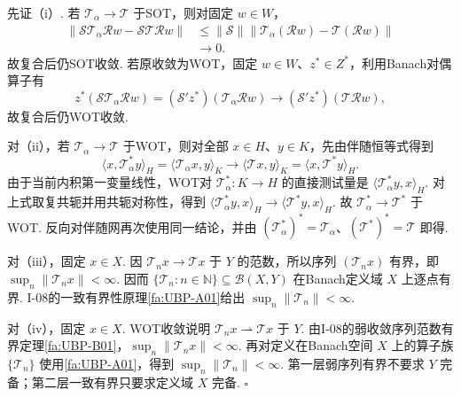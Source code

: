 \begin{FAProof}
先证（i）. 若 \(\displaystyle \mathcal T_\alpha\to\mathcal T\) 于SOT，则对固定 \(\displaystyle w\in W\)，
\[
\begin{aligned}
\displaystyle \|\mathcal S\mathcal T_\alpha\mathcal Rw-\mathcal S\mathcal T\mathcal Rw\|
&\displaystyle \leqslant\|\mathcal S\|\|\mathcal T_\alpha(\mathcal Rw)-\mathcal T(\mathcal Rw)\|\\
&\displaystyle \longrightarrow0.
\end{aligned}
\]
故复合后仍SOT收敛. 若原收敛为WOT，固定 \(\displaystyle w\in W\)、\(\displaystyle z^*\in Z^*\)，利用Banach对偶算子有
\[
z^*(\mathcal S\mathcal T_\alpha\mathcal Rw)
=(\mathcal S'z^*)(\mathcal T_\alpha\mathcal Rw)
\longrightarrow
(\mathcal S'z^*)(\mathcal T\mathcal Rw),
\]
故复合后仍WOT收敛.

对（ii），若 \(\displaystyle \mathcal T_\alpha\to\mathcal T\) 于WOT，则对全部 \(\displaystyle x\in H\)、\(\displaystyle y\in K\)，先由伴随恒等式得到
\[
\langle x,\mathcal T_\alpha^*y\rangle_H
=\langle\mathcal T_\alpha x,y\rangle_K
\longrightarrow
\langle\mathcal T x,y\rangle_K
=\langle x,\mathcal T^*y\rangle_H.
\]
由于当前内积第一变量线性，WOT对 \(\displaystyle \mathcal T_\alpha^*:K\to H\) 的直接测试量是 \(\displaystyle \langle\mathcal T_\alpha^*y,x\rangle_H\). 对上式取复共轭并用共轭对称性，得到
\(\displaystyle \langle\mathcal T_\alpha^*y,x\rangle_H \longrightarrow \langle\mathcal T^*y,x\rangle_H\).
故 \(\displaystyle \mathcal T_\alpha^*\to\mathcal T^*\) 于WOT. 反向对伴随网再次使用同一结论，并由 \(\displaystyle (\mathcal T_\alpha^*)^*=\mathcal T_\alpha\)、\(\displaystyle (\mathcal T^*)^*=\mathcal T\) 即得.

对（iii），固定 \(\displaystyle x\in X\). 因 \(\displaystyle \mathcal T_nx\to\mathcal T x\) 于 \(\displaystyle Y\) 的范数，所以序列 \(\displaystyle (\mathcal T_nx)\) 有界，即 \(\displaystyle \sup_n\|\mathcal T_nx\|<\infty\). 因而 \(\displaystyle \{\mathcal T_n:n\in\mathbb N\}\subseteq\mathcal B(X,Y)\) 在Banach定义域 \(\displaystyle X\) 上逐点有界. I-08的一致有界性原理\autoref{fa:UBP-A01}给出 \(\displaystyle \sup_n\|\mathcal T_n\|<\infty\).

对（iv），固定 \(\displaystyle x\in X\). WOT收敛说明 \(\displaystyle \mathcal T_nx\rightharpoonup\mathcal T x\) 于 \(\displaystyle Y\). 由I-08的弱收敛序列范数有界定理\autoref{fa:UBP-B01}，\(\displaystyle \sup_n\|\mathcal T_nx\|<\infty\). 再对定义在Banach空间 \(\displaystyle X\) 上的算子族 \(\displaystyle \{\mathcal T_n\}\) 使用\autoref{fa:UBP-A01}，得到 \(\displaystyle \sup_n\|\mathcal T_n\|<\infty\). 第一层弱序列有界不要求 \(\displaystyle Y\) 完备；第二层一致有界只要求定义域 \(\displaystyle X\) 完备.
\hfill\(\square\)
\end{FAProof}

